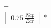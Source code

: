 \documentclass[preview]{standalone}
\begin{document}
\begin{align*}
+ \\ \begin{bmatrix} 0.75 \ \frac{Nap}{Ear} \end{bmatrix} *
\end{align*}
\end{document}
